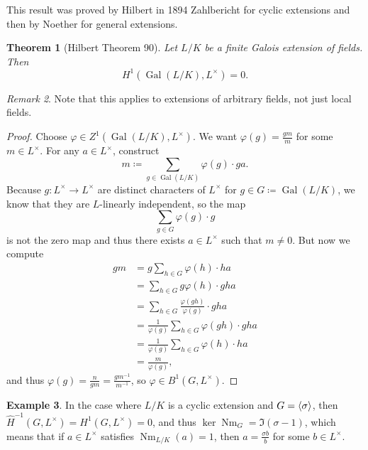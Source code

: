 \documentclass[leqno, openany]{memoir}
\newtheorem{thm}{Theorem}[section]
\theoremstyle{definition}
\newtheorem{exm}[thm]{Example}
\theoremstyle{remark}
\newtheorem{rmk}[thm]{Remark}
\theoremstyle{plain}
\theoremstyle{definition}
\theoremstyle{remark}
\newcommand{\wh}[1]{\widehat{#1}}
\DeclareMathOperator{\Gal}{Gal}
\DeclareMathOperator{\Nm}{Nm}
\begin{document}
This result was proved by Hilbert in 1894 Zahlbericht for cyclic extensions and
then by Noether for general extensions.

\begin{thm}[Hilbert Theorem 90] Let $L/K$ be a finite Galois extension of
    fields. Then \[ H^1(\Gal(L/K), L^{\times}) = 0. \] \end{thm}

\begin{rmk} Note that this applies to extensions of arbitrary fields, not just
local fields.  \end{rmk}

\begin{proof} Choose $\varphi \in Z^1 (\Gal(L/K), L^{\times})$. We want
    $\varphi(g) = \frac{gm}{m}$ for some $m \in L^{\times}$. For any $a \in
    L^{\times}$, construct \[ m \coloneqq \sum_{g \in \Gal(L/K)} \varphi(g)
    \cdot ga. \] Because $g \colon L^{\times} \to L^{\times}$ are distinct
    characters of $L^{\times}$ for $g \in G \coloneqq \Gal(L/K)$, we know that
    they are $L$-linearly independent, so the map \[ \sum_{g \in G} \varphi(g)
        \cdot g \] is not the zero map and thus there exists $a \in L^{\times}$
        such that $m \neq 0$. But now we compute \begin{align*} gm &= g \sum_{h
            \in G} \varphi(h) \cdot ha \\ &= \sum_{h \in G} g \varphi(h) \cdot
            gha \\ &= \sum_{h \in G} \frac{\varphi(gh)}{\varphi(g)} \cdot gha
                \\ &= \frac{1}{\varphi(g)} \sum_{h \in G} \varphi(gh) \cdot gha
                \\ &= \frac{1}{\varphi(g)} \sum_{h \in G} \varphi(h) \cdot ha
                \\ &= \frac{m}{\varphi(g)}, \end{align*} and thus $\varphi(g) =
            \frac{n}{gm} = \frac{gm^{-1}}{m^{-1}}$, so $\varphi \in B^1(G,
        L^{\times})$.  \end{proof}

\begin{exm} In the case where $L/K$ is a cyclic extension and $G =
    \ev{\sigma}$, then $\wh{H}^{-1}(G, L^{\times}) = H^1(G, L^{\times}) = 0$,
    and thus $\ker \Nm_G = \Im (\sigma - 1)$, which means that if $a \in
    L^{\times}$ satisfies $\Nm_{L/K}(a) = 1$, then $a = \frac{\sigma b}{b}$ for
    some $b \in L^{\times}$.  \end{exm}
\end{document}
